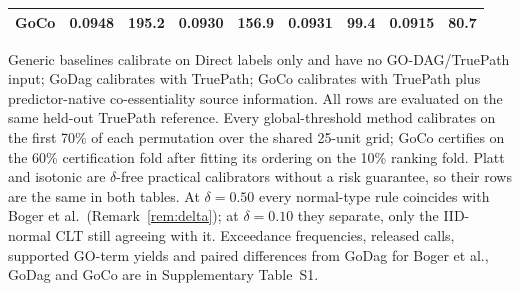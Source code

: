 \begin{table}[!t]
{\begin{tabular}{l rr rr rr rr}
\textbf{GoCo} & 0.0948 & 195.2 & 0.0930 & 156.9 & 0.0931 & 99.4 & 0.0915 & 80.7 \\
\bottomrule
\end{tabular}}
\par\vspace{3pt}\begin{minipage}{\linewidth}\footnotesize Generic baselines calibrate on Direct labels only and have no GO-DAG/TruePath input; GoDag calibrates with TruePath; GoCo calibrates with TruePath plus predictor-native co-essentiality source information. All rows are evaluated on the same held-out TruePath reference. Every global-threshold method calibrates on the first 70\% of each permutation over the shared 25-unit grid; GoCo certifies on the 60\% certification fold after fitting its ordering on the 10\% ranking fold. Platt and isotonic are $\delta$-free practical calibrators without a risk guarantee, so their rows are the same in both tables. At $\delta=0.50$ every normal-type rule coincides with Boger et al.\ (Remark~\ref{rem:delta}); at $\delta=0.10$ they separate, only the IID-normal CLT still agreeing with it. Exceedance frequencies, released calls, supported GO-term yields and paired differences from GoDag for Boger et al., GoDag and GoCo are in Supplementary Table~S1.
\end{minipage}
\end{table}